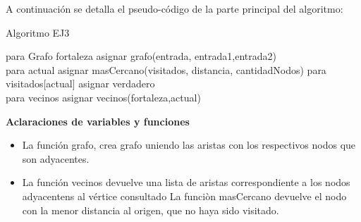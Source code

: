 A continuaci\'on se detalla el pseudo-c\'odigo de la parte principal del algoritmo:

\begin{algorithm}[H] %
 \caption{Algoritmo EJ3}
 	para Grafo fortaleza asignar grafo(entrada, entrada1,entrada2)\\
 	{
	para actual asignar masCercano(visitados, distancia, cantidadNodos)
	para visitados[actual] asignar verdadero\\
	para vecinos asignar vecinos(fortaleza,actual)\\
 	}
\end{algorithm}


\textbf{Aclaraciones de variables y funciones}
\begin{itemize}
\item La funci\'on grafo, crea grafo uniendo las aristas con los respectivos nodos que son adyacentes.
\item La funci\'on vecinos devuelve una lista de aristas correspondiente a los nodos adyacentens al v\'ertice consultado
\iten La funci\`on masCercano devuelve el nodo con la menor distancia al origen, que no haya sido visitado. 
\end{itemize}

